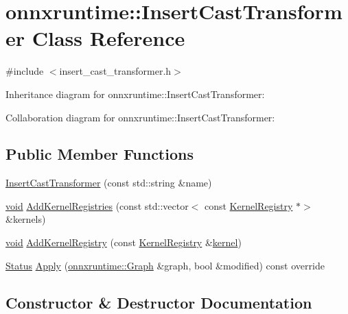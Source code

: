 \hypertarget{classonnxruntime_1_1InsertCastTransformer}{}\section{onnxruntime\+:\+:Insert\+Cast\+Transformer Class Reference}
\label{classonnxruntime_1_1InsertCastTransformer}


{\ttfamily \#include $<$insert\+\_\+cast\+\_\+transformer.\+h$>$}



Inheritance diagram for onnxruntime\+:\+:Insert\+Cast\+Transformer\+:


Collaboration diagram for onnxruntime\+:\+:Insert\+Cast\+Transformer\+:
\subsection*{Public Member Functions}
\begin{DoxyCompactItemize}
\item 
\mbox{\hyperlink{classonnxruntime_1_1InsertCastTransformer_a0e09fe80f4600d8491bca07ec417456e}{Insert\+Cast\+Transformer}} (const std\+::string \&name)
\item 
\mbox{\hyperlink{mlasi_8h_a88f941d423cb2a819b70a1358982b1a6}{void}} \mbox{\hyperlink{classonnxruntime_1_1InsertCastTransformer_ac2f4e0e5153f9c688b576b7ff0a273e6}{Add\+Kernel\+Registries}} (const std\+::vector$<$ const \mbox{\hyperlink{classonnxruntime_1_1KernelRegistry}{Kernel\+Registry}} $\ast$$>$ \&kernels)
\item 
\mbox{\hyperlink{mlasi_8h_a88f941d423cb2a819b70a1358982b1a6}{void}} \mbox{\hyperlink{classonnxruntime_1_1InsertCastTransformer_a97273a06a21e7972b8d489604cd9f6b2}{Add\+Kernel\+Registry}} (const \mbox{\hyperlink{classonnxruntime_1_1KernelRegistry}{Kernel\+Registry}} \&\mbox{\hyperlink{mkldnn_2nn_2pool_8cc_a1fd14bdce0b9db48a6bf8c6ce1320490}{kernel}})
\item 
\mbox{\hyperlink{classonnxruntime_1_1common_1_1Status}{Status}} \mbox{\hyperlink{classonnxruntime_1_1InsertCastTransformer_a059a832a759981af5fdeed0780e65904}{Apply}} (\mbox{\hyperlink{classonnxruntime_1_1Graph}{onnxruntime\+::\+Graph}} \&graph, bool \&modified) const override
\end{DoxyCompactItemize}


\subsection{Constructor \& Destructor Documentation}
\mbox{\label{classonnxruntime_1_1InsertCastTransformer_a0e09fe80f4600d8491bca07ec417456e}} 
